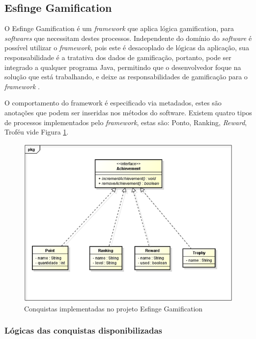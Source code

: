 \subsection{Esfinge Gamification}

\par O Esfinge Gamification é um \textit{framework} que aplica lógica gamification, para \textit{softwares} que necessitam destes processos. Independente do domínio do \textit{software} é possível utilizar o \textit{framework}, pois este é desacoplado de lógicas da aplicação, sua responsabilidade é a tratativa dos dados de gamificação, portanto, pode ser integrado a qualquer programa Java, permitindo que o desenvolvedor foque na solução que está trabalhando, e deixe as responsabilidades de gamificação para o \textit{framework}  \cite{esfinge2011}.
\par O comportamento do framework é especificado via metadados, estes são anotações que podem ser inseridas nos métodos do software. Existem quatro tipos de processos implementados pelo \textit{framework}, estas são: Ponto, Ranking, \textit{Reward}, Troféu vide Figura \ref{fig:arquitetura-esfinge-gamification}. 

\begin{figure}[H]
    \centering
    \includegraphics{src/imagens/cap2/estrutura-conquistas.png}
    \caption{Conquistas implementadas no projeto Esfinge Gamification}
    \label{fig:arquitetura-esfinge-gamification}
\end{figure}

\subsubsection{Lógicas das conquistas disponibilizadas}

